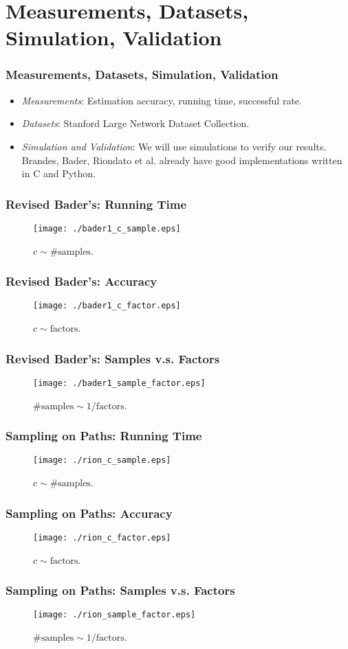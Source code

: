 \documentclass[12pt]{beamer}
\begin{document}
\section{Measurements, Datasets, Simulation, Validation}
\begin{frame}
	\frametitle{Measurements, Datasets, Simulation, Validation}
	\begin{itemize}
	\item {\it Measurements}: Estimation accuracy, running time, successful rate.
	\item {\it Datasets}: Stanford Large Network Dataset Collection.
	\item {\it Simulation and Validation}: We will use simulations to verify our results. Brandes, Bader, Riondato et al. already have good implementations written in C and Python.
	\end{itemize}
\end{frame}

\begin{frame}
	\frametitle{Revised Bader's: Running Time}
	\begin{figure}
	\texttt{[image: ./bader1\_c\_sample.eps]}
\caption{$c \sim \textrm{\# samples}$.}
\end{figure}
\end{frame}

\begin{frame}
	\frametitle{Revised Bader's: Accuracy}
	\begin{figure}
	\texttt{[image: ./bader1\_c\_factor.eps]}
\caption{$c \sim \textrm{factors}$.}
\end{figure}
\end{frame}

\begin{frame}
	\frametitle{Revised Bader's: Samples v.s. Factors}
	\begin{figure}
	\texttt{[image: ./bader1\_sample\_factor.eps]}
\caption{$\textrm{\# samples} \sim 1/\textrm{factors}$.}
\end{figure}
\end{frame}

\begin{frame}
	\frametitle{Sampling on Paths: Running Time}
	\begin{figure}
	\texttt{[image: ./rion\_c\_sample.eps]}
\caption{$c \sim \textrm{\# samples}$.}
\end{figure}
\end{frame}

\begin{frame}
	\frametitle{Sampling on Paths: Accuracy}
	\begin{figure}
	\texttt{[image: ./rion\_c\_factor.eps]}
\caption{$c \sim \textrm{factors}$.}
\end{figure}
\end{frame}

\begin{frame}
	\frametitle{Sampling on Paths: Samples v.s. Factors}
	\begin{figure}
	\texttt{[image: ./rion\_sample\_factor.eps]}
\caption{$\textrm{\# samples} \sim 1/\textrm{factors}$.}
\end{figure}
\end{frame}
\end{document}
